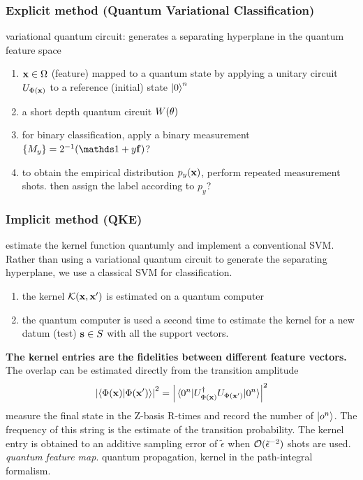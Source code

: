 \subsubsection{Explicit method (Quantum Variational Classification)}
variational quantum circuit: generates a separating hyperplane in the quantum feature space
\begin{enumerate}
	\item $\vb{x}\in\Omega$ (feature) mapped to a quantum state by applying a unitary circuit $U_{\Phi(\vb{x})}$ to a reference (initial) state $\ket{0}^n$
	\item a short depth quantum circuit $W(\vb{\theta})$
	\item for binary classification, apply a binary measurement $\qty{M_y}=2^{-1}(\identity + y \vb{f})$?
	\item to obtain the empirical distribution $p_y(\vb{x})$, perform repeated measurement shots.
	then assign the label according to $p_y$?
\end{enumerate}

\subsubsection{Implicit method (QKE)}
estimate the kernel function quantumly and implement a conventional SVM.
Rather than using a variational quantum circuit to generate the separating hyperplane, we use a classical SVM for classification.
\begin{enumerate}
	\item the kernel $\mathcal{K}(\vb{x},\vb{x}')$ is estimated on a quantum computer
	\item the quantum computer is used a second time to estimate the kernel for a new datum (test) $\vb{s}\in S$ with all the support vectors.
\end{enumerate}

\textbf{The kernel entries are the fidelities between different feature vectors.}
The overlap can be estimated directly from the transition amplitude 
\begin{equation}
	\abs{\braket{\Phi(\vbx)}{\Phi(\vbx')}}^2 = 
	\abs{\matrixel{0^n}{U^\dagger_{\Phi(\vbx)} U_{\Phi(\vbx')}}{0^n}}^2
\end{equation}
measure the final state in the Z-basis R-times and record the number of $\ket{o^n}$.
The frequency of this string is the estimate of the transition probability.
The kernel entry is obtained to an additive sampling error of $\tilde{\epsilon}$ when $\mathcal{O}(\tilde{\epsilon}^{-2})$ shots are used.
\emph{quantum feature map}.
quantum propagation, kernel in the path-integral formalism.

